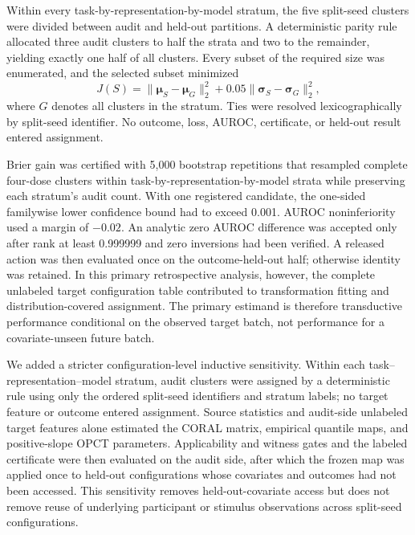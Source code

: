 \documentclass[preprint,12pt]{elsarticle}
\begin{document}
Within every task-by-representation-by-model stratum, the five split-seed clusters were divided between audit and held-out partitions. A deterministic parity rule allocated three audit clusters to half the strata and two to the remainder, yielding exactly one half of all clusters. Every subset of the required size was enumerated, and the selected subset minimized
\begin{equation}
J(S)=\|\boldsymbol\mu_S-\boldsymbol\mu_G\|_2^2+0.05\|\boldsymbol\sigma_S-\boldsymbol\sigma_G\|_2^2,
\end{equation}
where $G$ denotes all clusters in the stratum. Ties were resolved lexicographically by split-seed identifier. No outcome, loss, AUROC, certificate, or held-out result entered assignment.

Brier gain was certified with 5,000 bootstrap repetitions that resampled complete four-dose clusters within task-by-representation-by-model strata while preserving each stratum's audit count. With one registered candidate, the one-sided familywise lower confidence bound had to exceed 0.001. AUROC noninferiority used a margin of $-0.02$. An analytic zero AUROC difference was accepted only after rank at least 0.999999 and zero inversions had been verified. A released action was then evaluated once on the outcome-held-out half; otherwise identity was retained. In this primary retrospective analysis, however, the complete unlabeled target configuration table contributed to transformation fitting and distribution-covered assignment. The primary estimand is therefore transductive performance conditional on the observed target batch, not performance for a covariate-unseen future batch.

We added a stricter configuration-level inductive sensitivity. Within each task--representation--model stratum, audit clusters were assigned by a deterministic rule using only the ordered split-seed identifiers and stratum labels; no target feature or outcome entered assignment. Source statistics and audit-side unlabeled target features alone estimated the CORAL matrix, empirical quantile maps, and positive-slope OPCT parameters. Applicability and witness gates and the labeled certificate were then evaluated on the audit side, after which the frozen map was applied once to held-out configurations whose covariates and outcomes had not been accessed. This sensitivity removes held-out-covariate access but does not remove reuse of underlying participant or stimulus observations across split-seed configurations.
\end{document}
